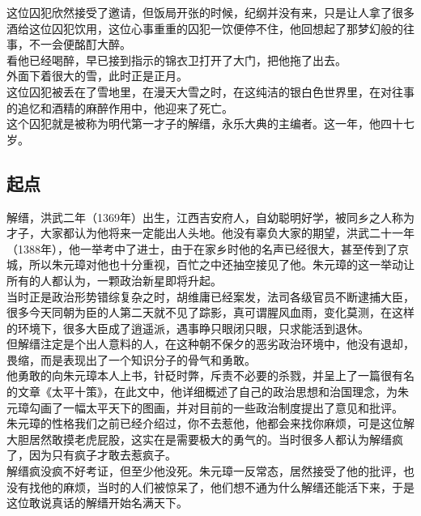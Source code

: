 \begin{multicols}{\theparacolNo}
这位囚犯欣然接受了邀请，但饭局开张的时候，纪纲并没有来，只是让人拿了很多酒给这位囚犯饮用，这位心事重重的囚犯一饮便停不住，他回想起了那梦幻般的往事，不一会便酩酊大醉。\\

看他已经喝醉，早已接到指示的锦衣卫打开了大门，把他拖了出去。\\

外面下着很大的雪，此时正是正月。\\

这位囚犯被丢在了雪地里，在漫天大雪之时，在这纯洁的银白色世界里，在对往事的追忆和酒精的麻醉作用中，他迎来了死亡。\\

这个囚犯就是被称为明代第一才子的解缙，永乐大典的主编者。这一年，他四十七岁。\\

\subsection{起点}
解缙，洪武二年（1369年）出生，江西吉安府人，自幼聪明好学，被同乡之人称为才子，大家都认为他将来一定能出人头地。他没有辜负大家的期望，洪武二十一年（1388年），他一举考中了进士，由于在家乡时他的名声已经很大，甚至传到了京城，所以朱元璋对他也十分重视，百忙之中还抽空接见了他。朱元璋的这一举动让所有的人都认为，一颗政治新星即将升起。\\

当时正是政治形势错综复杂之时，胡维庸已经案发，法司各级官员不断逮捕大臣，很多今天同朝为臣的人第二天就不见了踪影，真可谓腥风血雨，变化莫测，在这样的环境下，很多大臣成了逍遥派，遇事睁只眼闭只眼，只求能活到退休。\\

但解缙注定是个出人意料的人，在这种朝不保夕的恶劣政治环境中，他没有退却，畏缩，而是表现出了一个知识分子的骨气和勇敢。\\

他勇敢的向朱元璋本人上书，针砭时弊，斥责不必要的杀戮，并呈上了一篇很有名的文章《太平十策》，在此文中，他详细概述了自己的政治思想和治国理念，为朱元璋勾画了一幅太平天下的图画，并对目前的一些政治制度提出了意见和批评。\\

朱元璋的性格我们之前已经介绍过，你不去惹他，他都会来找你麻烦，可是这位解大胆居然敢摸老虎屁股，这实在是需要极大的勇气的。当时很多人都认为解缙疯了，因为只有疯子才敢去惹疯子。\\

解缙疯没疯不好考证，但至少他没死。朱元璋一反常态，居然接受了他的批评，也没有找他的麻烦，当时的人们被惊呆了，他们想不通为什么解缙还能活下来，于是这位敢说真话的解缙开始名满天下。\\


\end{multicols}
